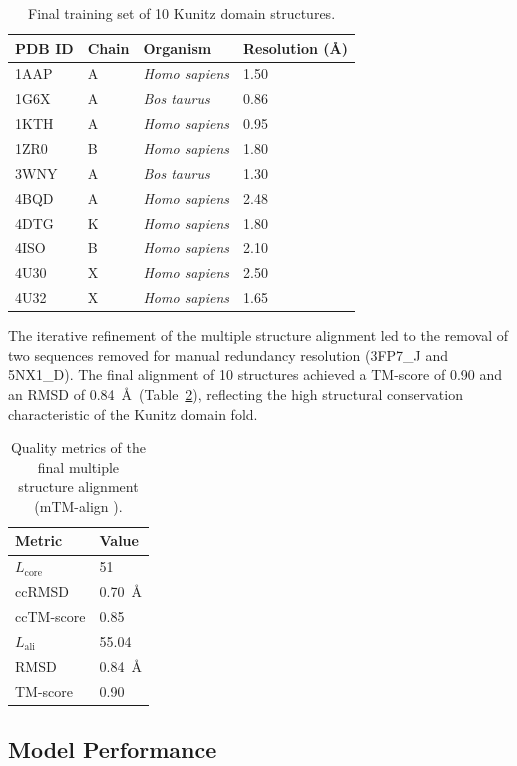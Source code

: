 \documentclass[11pt, a4paper]{article}
\begin{document}
\begin{table}[H]
\centering
\caption{Final training set of 10 Kunitz domain structures.}
\label{tab:training}
\begin{tabular}{llll}
\toprule
PDB ID & Chain & Organism & Resolution (\AA) \\
\midrule
1AAP & A & \textit{Homo sapiens} & 1.50 \\
1G6X & A & \textit{Bos taurus} & 0.86 \\
1KTH & A & \textit{Homo sapiens} & 0.95 \\
1ZR0 & B & \textit{Homo sapiens} & 1.80 \\
3WNY & A & \textit{Bos taurus} & 1.30 \\
4BQD & A & \textit{Homo sapiens} & 2.48 \\
4DTG & K & \textit{Homo sapiens} & 1.80 \\
4ISO & B & \textit{Homo sapiens} & 2.10 \\
4U30 & X & \textit{Homo sapiens} & 2.50 \\
4U32 & X & \textit{Homo sapiens} & 1.65 \\
\bottomrule
\end{tabular}
\end{table}

The iterative refinement of the multiple structure alignment 
led to the removal of two sequences removed for manual 
redundancy resolution (3FP7\_J and 5NX1\_D). The final 
alignment of 10 structures achieved a TM-score of 0.90 and 
an RMSD of 0.84~\AA\ (Table~\ref{tab:msa_metrics}), 
reflecting the high structural conservation characteristic 
of the Kunitz domain fold.

\begin{table}[H]
\centering
\caption{Quality metrics of the final multiple structure 
alignment (mTM-align \cite{Dong2018}).}
\label{tab:msa_metrics}
\begin{tabular}{ll}
\toprule
Metric & Value \\
\midrule
$L_\text{core}$ & 51 \\
ccRMSD & 0.70~\AA \\
ccTM-score & 0.85 \\
$L_\text{ali}$ & 55.04 \\
RMSD & 0.84~\AA \\
TM-score & 0.90 \\
\bottomrule
\end{tabular}
\end{table}

\subsection{Model Performance}
\end{document}
